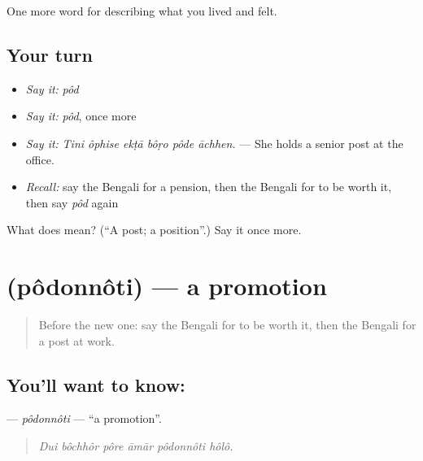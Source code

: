 \begin{grammarlens}[title={What you've built}]
One more word for describing what you lived and felt.
\end{grammarlens}

\subsection*{Your turn}
\begin{itemize}
\raggedright
  \item \emph{Say it:} \emph{pôd}
  \item \emph{Say it:} \emph{pôd}, once more
  \item \emph{Say it:} \emph{Tini ôphise ekṭā bôṛo pôde āchhen.} — She holds a senior post at the office.
  \item \emph{Recall:} say the Bengali for a pension, then the Bengali for to be worth it, then say \emph{pôd} again
\end{itemize}

\begin{tcolorbox}[breakable,colback=teal!4,colframe=teal!35!black,title={Before you move on}]
What does  mean? (\textquotedblleft{}A post; a position\textquotedblright{}.) Say it once more.
\end{tcolorbox}
\section[\texorpdfstring{\bn{পদোন্নতি} (pôdonnôti)}{পদোন্নতি (pôdonnôti)}]{ (pôdonnôti) — a promotion}

\label{lesson:BN-C496-podonnoti}



\begin{quote}
Before the new one: say the Bengali for to be worth it, then the Bengali for a post at work.
\end{quote}

\subsection*{You'll want to know: }
\textbf{} — \emph{pôdonnôti} — \textquotedblleft{}a promotion\textquotedblright{}.

\begin{quote}
     
\end{quote}

\begin{quote}
\emph{Dui bôchhôr pôre āmār pôdonnôti hôlô.}
\end{quote}

